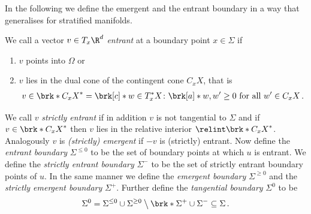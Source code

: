 In the following we define the emergent and the entrant boundary in a way that generalises
\cite[p.282]{Morse1970} for stratified manifolds.
\begin{definition}\label{df:emergentEntrantBd}
  We call a vector $v\in T_x\R^d$ \emph{entrant} at a boundary point $x\in\Sigma$ if
  \begin{enumerate}
    \item $v$ points into $\Omega$ or
    \item $v$ lies in the dual cone of the contingent cone $C_xX$, that is
    \begin{align*}
      v\in \brk*{C_xX}^*=\brk[c]*{w\in T_x^*X\colon \brk[a]*{w, w'}\geq0\text{ for all }w'\in C_xX}\,.
    \end{align*}
  \end{enumerate}
  We call $v$ \emph{strictly entrant} if in addition $v$ is not tangential to $\Sigma$ and if $v\in\brk*{C_xX}^*$ then
  $v$ lies in the relative interior $\relint\brk*{C_xX}^*$.
  Analogously $v$ is \emph{(strictly) emergent} if $-v$ is (strictly) entrant.
  Now define the \emph{entrant boundary} $\Sigma^{\leq0}$ to be the set of boundary points at which $u$ is entrant.
  We define the \emph{strictly entrant boundary} $\Sigma^-$ to be the set of strictly entrant boundary points of $u$.
  In the same manner we define the \emph{emergent boundary} $\Sigma^{\geq0}$ and the \emph{strictly emergent boundary} $\Sigma^+$.
  Further define the \emph{tangential boundary} $\Sigma^0$ to be
  \begin{align}
    \Sigma^0=\Sigma^{\leq0}\cup\Sigma^{\geq0}\bigsetminus\brk*{\Sigma^+\cup\Sigma^-}\subseteq\Sigma\,.
  \end{align}
\end{definition}

